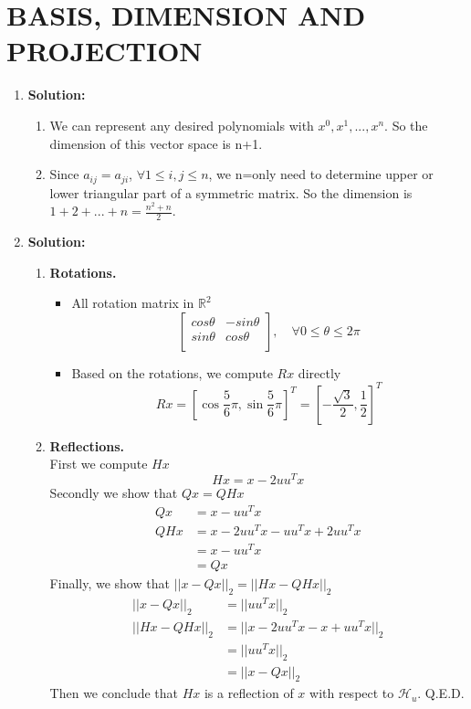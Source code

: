 \section{BASIS, DIMENSION AND PROJECTION}

\begin{enumerate}
	\item \textbf{Solution:}
	\begin{enumerate}
		\item We can represent any desired polynomials with ${x^0, x^1,..., x^n}$. So the dimension of this vector space is n+1.
		
		\item Since $a_{ij}=a_{ji}$, $\forall 1\le i, j\le n$, we n=only need to determine upper or lower triangular part of a symmetric matrix. So the dimension is $1+2+...+n=\frac{n^2+n}{2}$.
	\end{enumerate}

	\item \textbf{Solution:}
	\begin{enumerate}
		\item \textbf{Rotations.}
		\begin{itemize}
			\item All rotation matrix in $\mathbb{R}^2$
\begin{equation*}
\left[
\begin{array}{cc}
cos\theta & -sin\theta \\
sin\theta & cos\theta \\
\end{array}
\right],\quad \forall 0\le\theta\le2\pi
\end{equation*}

		\item Based on the rotations, we compute $Rx$ directly
		$$Rx=[\cos\frac{5}{6}\pi, \sin\frac{5}{6}\pi]^T=[-\frac{\sqrt{3}}{2}, \frac{1}{2}]^T$$
		\end{itemize}
		
		\item \textbf{Reflections.}\\
			First we compute $Hx$
			$$Hx=x-2uu^Tx$$
			Secondly we show that $Qx=QHx$
			\begin{align*}
			Qx&=x - uu^Tx\\
			QHx&=x-2uu^Tx-uu^Tx+2uu^Tx\\
			&=x-uu^Tx\\&=Qx
			\end{align*}
			Finally, we show that $||x-Qx||_2=||Hx-QHx||_2$
			\begin{align*}
			||x-Qx||_2 &= ||uu^Tx||_2\\
			||Hx-QHx||_2 &= ||x-2uu^Tx-x+uu^Tx||_2\\
			&=||uu^Tx||_2\\
			&= 	||x-Qx||_2
			\end{align*}
			Then we conclude that $Hx$ is a reflection of $x$ with respect to $\mathcal{H}_u$. Q.E.D.
	\end{enumerate}
\end{enumerate}
